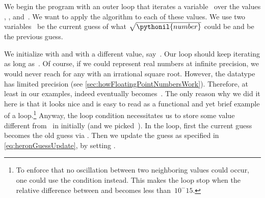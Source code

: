 We begin the program with an outer  loop that iterates a variable~ over the  values , , and~.
We want to apply the algorithm to each of these values.
We use two variables~ be the current guess of what $\sqrt{\pythonil{number}}$ could be and  be the previous guess.

We initialize  with  and  with a different value, say~.
Our  loop should keep iterating as long as~.
Of course, if we could represent real numbers at infinite precision, we would never reach  for any  with an irrational square root.
However, the  datatype has limited precision (see \cref{sec:howFloatingPointNumbersWork}).
Therefore, at least in our examples,  indeed eventually becomes~.%
%
%
%
The only reason why we did it here is that it looks nice and is easy to read as a functional and yet brief example of a  loop.\footnote{%
To enforce that no oscillation between two neighboring  values could occur, one could use the condition  instead. %
This makes the loop stop when the relative difference between  and  becomes less than~$10^-{15}$.%
}%
Anyway, the loop condition necessitates us to store some value different from~ in  initially (and we picked~).
In the loop, first the current guess becomes the old guess via .
Then we update the guess as specified in \cref{eq:heronGuessUpdate}, by setting .

